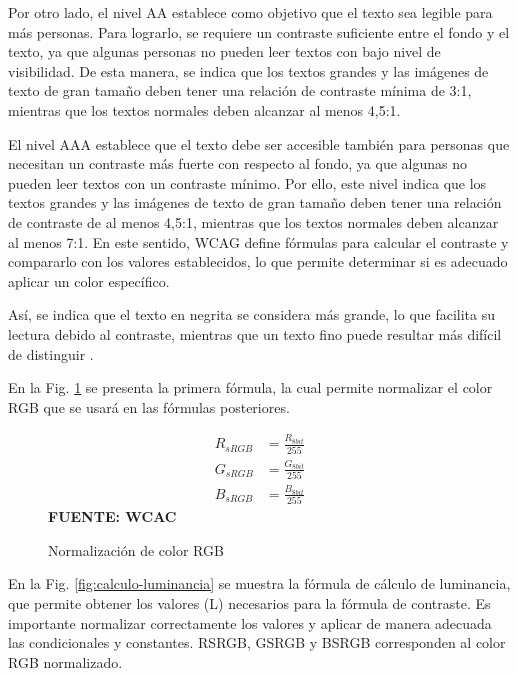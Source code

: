 \documentclass[lettersize,journal]{IEEEtran}
\begin{document}
\begin{itemize}
		\noindent Por otro lado, el nivel AA establece como objetivo que el texto sea legible para más personas. Para lograrlo, se requiere un contraste suficiente entre el fondo y el texto, ya que algunas personas no pueden leer textos con bajo nivel de visibilidad. De esta manera, se indica que los textos grandes y las imágenes de texto de gran tamaño deben tener una relación de contraste mínima de 3:1, mientras que los textos normales deben alcanzar al menos 4,5:1.
		 
		\noindent El nivel AAA establece que el texto debe ser accesible también para personas que necesitan un contraste más fuerte con respecto al fondo, ya que algunas no pueden leer textos con un contraste mínimo. Por ello, este nivel indica que los textos grandes y las imágenes de texto de gran tamaño deben tener una relación de contraste de al menos 4,5:1, mientras que los textos normales deben alcanzar al menos 7:1. En este sentido, WCAG define fórmulas para calcular el contraste y compararlo con los valores establecidos, lo que permite determinar si es adecuado aplicar un color específico.
		
		\noindent Así, se indica que el texto en negrita se considera más grande, lo que facilita su lectura debido al contraste, mientras que un texto fino puede resultar más difícil de distinguir \cite{WCAG22}.
		
		\noindent En la Fig. \ref{fig:normalizacion-rgb} se presenta la primera fórmula, la cual permite normalizar el color RGB que se usará en las fórmulas posteriores. 
		
		\begin{figure}[ht]
			\centering
			\caption{Normalización de color RGB}
			\label{fig:normalizacion-rgb}
			\[
			\begin{aligned}
				R_{sRGB} &= \frac{R_{8bit}}{255} \\
				G_{sRGB} &= \frac{G_{8bit}}{255} \\
				B_{sRGB} &= \frac{B_{8bit}}{255}
			\end{aligned}
			\]
			\small\textbf{FUENTE: WCAC \cite{W3CLuminance2021}}
		\end{figure}
	
		\noindent En la Fig. \ref{fig:calculo-luminancia} se muestra la fórmula de cálculo de luminancia, que permite obtener los valores (L) necesarios para la fórmula de contraste. Es importante normalizar correctamente los valores y aplicar de manera adecuada las condicionales y constantes. RSRGB, GSRGB y BSRGB corresponden al color RGB normalizado.
		

\end{itemize}
\end{document}
